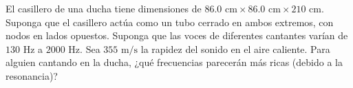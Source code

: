 \item El casillero de una ducha tiene dimensiones de $86.0\text{ cm} \times 86.0\text{ cm} \times 210\text{ cm}$. Suponga que el casillero actúa como un tubo cerrado en ambos extremos, con nodos en lados opuestos. Suponga que las voces de diferentes cantantes varían de $130\text{ Hz}$ a $2000\text{ Hz}$. Sea $355\text{ m/s}$ la rapidez del sonido en el aire caliente. Para alguien cantando en la ducha, ¿qué frecuencias parecerán más ricas (debido a la resonancia)?